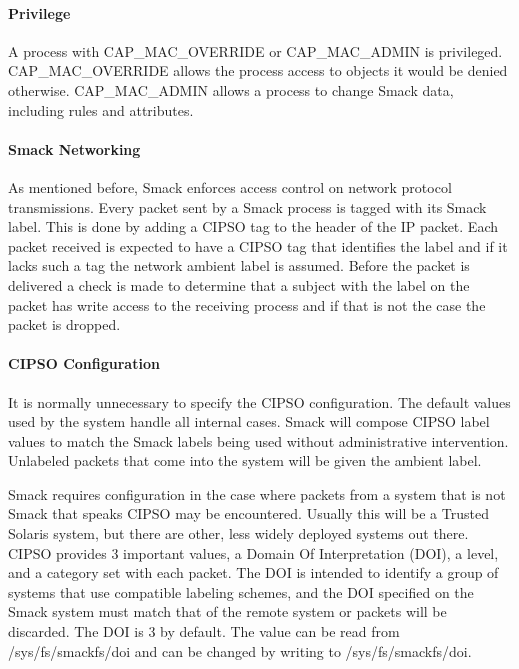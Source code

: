 \documentclass[a4paper,8pt,english]{sphinxmanual}
\begin{document}
\paragraph{Privilege}
\label{admin-guide/LSM/Smack:privilege}
A process with CAP\_MAC\_OVERRIDE or CAP\_MAC\_ADMIN is privileged.
CAP\_MAC\_OVERRIDE allows the process access to objects it would
be denied otherwise. CAP\_MAC\_ADMIN allows a process to change
Smack data, including rules and attributes.


\paragraph{Smack Networking}
\label{admin-guide/LSM/Smack:smack-networking}
As mentioned before, Smack enforces access control on network protocol
transmissions. Every packet sent by a Smack process is tagged with its Smack
label. This is done by adding a CIPSO tag to the header of the IP packet. Each
packet received is expected to have a CIPSO tag that identifies the label and
if it lacks such a tag the network ambient label is assumed. Before the packet
is delivered a check is made to determine that a subject with the label on the
packet has write access to the receiving process and if that is not the case
the packet is dropped.


\paragraph{CIPSO Configuration}
\label{admin-guide/LSM/Smack:cipso-configuration}
It is normally unnecessary to specify the CIPSO configuration. The default
values used by the system handle all internal cases. Smack will compose CIPSO
label values to match the Smack labels being used without administrative
intervention. Unlabeled packets that come into the system will be given the
ambient label.

Smack requires configuration in the case where packets from a system that is
not Smack that speaks CIPSO may be encountered. Usually this will be a Trusted
Solaris system, but there are other, less widely deployed systems out there.
CIPSO provides 3 important values, a Domain Of Interpretation (DOI), a level,
and a category set with each packet. The DOI is intended to identify a group
of systems that use compatible labeling schemes, and the DOI specified on the
Smack system must match that of the remote system or packets will be
discarded. The DOI is 3 by default. The value can be read from
/sys/fs/smackfs/doi and can be changed by writing to /sys/fs/smackfs/doi.
\end{document}
